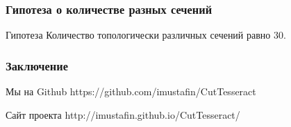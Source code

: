 \documentclass[10pt,pdf,hyperref={unicode}]{beamer}
\begin{document}
\begin{frame}
        \frametitle{Гипотеза о количестве разных сечений}
        \begin{block}{Гипотеза}
                Количество топологически различных сечений равно 30.
        \end{block}
\end{frame}

\begin{frame}
        \frametitle{Заключение}
        \begin{block}{Мы на Github}
                https://github.com/imustafin/CutTesseract
        \end{block}
        \begin{block}{Сайт проекта}
                http://imustafin.github.io/CutTesseract/
        \end{block}
\end{frame}
\end{document}
